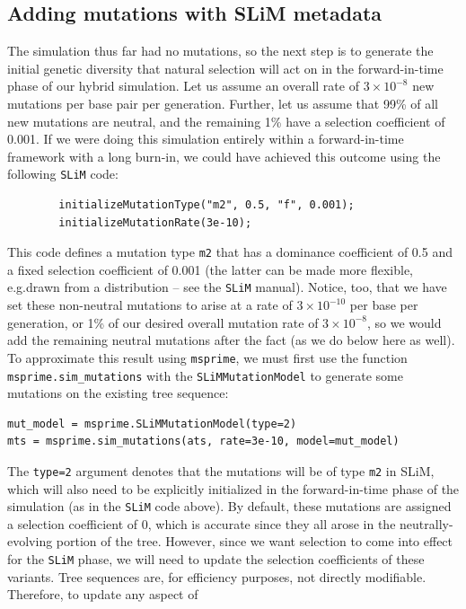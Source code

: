 \documentclass[12pt]{article}
\newcommand{\msprime}[0]{\texttt{msprime}\xspace}
\newcommand{\slim}[0]{\texttt{SLiM}\xspace}
\newcommand*{\eg}{e.g.\xcomma}
\begin{document}
\subsection*{Adding mutations with SLiM metadata}

The simulation thus far had no mutations, so
the next step is to generate the initial genetic diversity that natural selection will act on
in the forward-in-time phase of our hybrid simulation. Let us assume an overall rate of $3 \times 10^{-8}$ new
mutations per base pair per generation. Further, let us assume that 99\% of all new mutations
are neutral, and the remaining 1\% have a selection coefficient of 0.001.
If we were doing this simulation entirely within a forward-in-time framework with a long
burn-in, we could have achieved this outcome using the following \slim code:
\begin{verbatim}
        initializeMutationType("m2", 0.5, "f", 0.001);
        initializeMutationRate(3e-10);
\end{verbatim}
This code defines a mutation type \verb|m2| that has a dominance coefficient of 0.5 and a fixed selection
coefficient of 0.001 (the latter can be made more flexible, \eg drawn from a distribution -- see the \slim manual).
Notice, too, that we have set these non-neutral mutations to arise at a rate of $3 \times 10^{-10}$ per base per generation,
or 1\% of our desired overall mutation rate of $3 \times 10^{-8}$,
so we would add the remaining neutral mutations after the fact (as we do below here as well).
To approximate this result using \msprime, we must first
use the function \verb|msprime.sim_mutations|
with the \verb|SLiMMutationModel| to generate some mutations on the existing tree sequence:
\begin{verbatim}
mut_model = msprime.SLiMMutationModel(type=2)
mts = msprime.sim_mutations(ats, rate=3e-10, model=mut_model)
\end{verbatim}
The \verb|type=2| argument denotes that the mutations will be of type \verb|m2| in SLiM, which will also
need to be explicitly initialized in the forward-in-time phase of the simulation (as in the \slim code above).
By default, these mutations are assigned a selection coefficient of 0, which is accurate since they
all arose in the neutrally-evolving portion of the tree. However, since we want selection to come into
effect for the \slim phase, we will need to update the selection coefficients of these variants.
Tree sequences are, for efficiency purposes, not directly modifiable. Therefore, to update any aspect of
\end{document}
